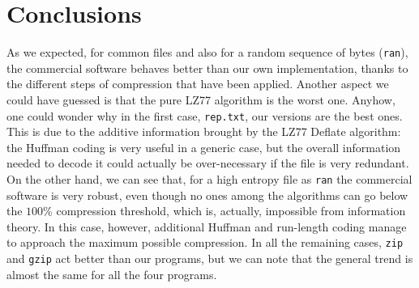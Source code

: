 \section{Conclusions}
As we expected, for common files and also for a random sequence of bytes (\texttt{ran}), the commercial software behaves better than our own implementation, thanks to the different steps of compression that have been applied. Another aspect we could have guessed is that the pure LZ77 algorithm is the worst one. Anyhow, one could wonder why in the first case, \texttt{rep.txt}, our versions are the best ones. This is due to the additive information brought by the LZ77 Deflate algorithm: the Huffman coding is very useful in a generic case, but the overall information needed to decode it could actually be over-necessary if the file is very redundant. On the other hand, we can see that, for a high entropy file as \texttt{ran} the commercial software is very robust, even though no ones among the algorithms can go below the $100$\% compression threshold, which is, actually, impossible from information theory. In this case, however, additional Huffman and run-length coding manage to approach the maximum possible compression. In all the remaining cases, \texttt{zip} and \texttt{gzip} act better than our programs, but we can note that the general trend is almost the same for all the four programs.
